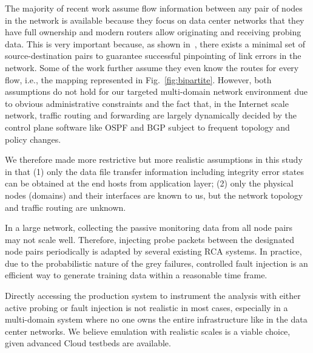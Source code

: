 The majority of recent work assume flow information between any pair of nodes in the network is available because they focus on data center networks that they have full ownership and modern routers allow originating and receiving probing data. This is very important because, as shown in~\cite{netbouncer:nsdi18}, there exists a minimal set of source-destination pairs to guarantee successful pinpointing of link errors in the network. Some of the work further assume they even know the routes for every flow, i.e., the mapping represented in Fig.~\ref{fig:bipartite}. However, both assumptions do not hold for our targeted multi-domain network environment due to obvious administrative constraints and the fact that, in the Internet scale network, traffic routing and forwarding are largely dynamically decided by the control plane software like OSPF and BGP subject to frequent topology and policy changes. 

We therefore made more restrictive but more realistic assumptions in this study in that (1) only the data file transfer information including integrity error states can be obtained at the end hosts from application layer; (2) only the physical nodes (domains) and their interfaces are known to us, but the network topology and traffic routing are unknown. 

In a large network, collecting the passive monitoring data from all node pairs may not scale well. Therefore, injecting probe packets between the designated node pairs periodically is adapted by several existing RCA systems. In practice, due to the probabilistic nature of the grey failures, controlled fault injection is an efficient way to generate training data within a reasonable time frame.

Directly accessing the production system to instrument the analysis with either active probing or fault injection is not realistic in most cases, especially in a multi-domain system where no one owns the entire infrastructure like in the data center networks. We believe emulation with realistic scales is a viable choice, given advanced Cloud testbeds are available.








